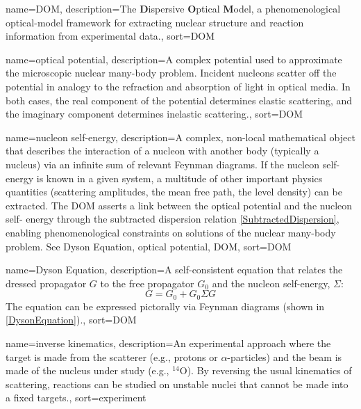 \makeglossaries

{
    name={DOM},
    description={The \textbf{D}ispersive \textbf{O}ptical \textbf{M}odel, a phenomenological optical-model framework for extracting nuclear structure and reaction information from experimental data.},
    sort={DOM}
}

{
    name={optical potential},
    description={A complex potential used to approximate the microscopic nuclear many-body problem. Incident nucleons scatter off the potential in analogy to the refraction and absorption of light in optical media.  In both cases, the real component of the potential determines elastic scattering, and the imaginary component determines inelastic scattering.},
    sort={DOM}
}

{
    name={nucleon self-energy},
    description={A complex, non-local mathematical object that describes the interaction of a
        nucleon with another body (typically a nucleus) via an infinite sum of relevant Feynman 
        diagrams. If the nucleon self-energy is known in a given system, a multitude of other 
        important physics quantities (scattering amplitudes, the mean free path, the level density) 
        can be extracted. The DOM asserts a link between the optical potential and the nucleon self-
        energy through the subtracted dispersion relation \ref{SubtractedDispersion}, enabling 
        phenomenological constraints on solutions of the nuclear many-body 
        problem. See \Gls{Dyson Equation}, \Gls{optical potential}, \Gls{DOM}},
    sort={DOM}
}

{
    name={Dyson Equation},
    description={A self-consistent equation that relates the dressed propagator $G$ to the free
        propagator $G_{0}$ and the \Gls{nucleon self-energy}, $\Sigma$:
        \begin{equation}
            G = G_{0} + G_{0} \Sigma G
        \end{equation}
        The equation can be expressed pictorally via Feynman diagrams (shown in
        \ref{DysonEquation}).},
    sort={DOM}
}

{
    name={inverse kinematics},
    description={An experimental approach where the target is made from
        the scatterer (e.g., protons or $\alpha$-particles) and
        the beam is made of the nucleus under study (e.g., $^{14}$O).
        By reversing the usual kinematics of scattering,
        reactions can be studied on unstable nuclei that
    cannot be made into a fixed targets.},
    sort={experiment}
}
